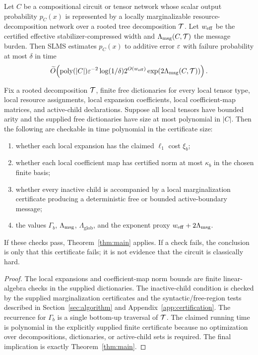 \begin{theorem}
\label{thm:main}
Let \(C\) be a compositional circuit or tensor network whose scalar output probability \(p_C(x)\) is represented by a locally marginalizable resource-decomposition network over a rooted tree decomposition \(\mathcal{T}\). Let \(w_{\mathrm{eff}}\) be the certified effective stabilizer-compressed width and \(\Lambda_{\mathrm{msg}}(C,\mathcal{T})\) the message burden. Then SLMS estimates \(p_C(x)\) to additive error \(\varepsilon\) with failure probability at most \(\delta\) in time
\[
\widetilde{O}\!\left(
\operatorname{poly}(|C|)
\varepsilon^{-2}\log(1/\delta)
2^{O(w_{\mathrm{eff}})}
\exp(2\Lambda_{\mathrm{msg}}(C,\mathcal{T}))
\right).
\]
\end{theorem}

\begin{proposition}
\label{prop:checkable-certificate}
Fix a rooted decomposition \(\mathcal{T}\), finite free dictionaries for every local tensor type, local resource assignments, local expansion coefficients, local coefficient-map matrices, and active-child declarations. Suppose all local tensors have bounded arity and the supplied free dictionaries have size at most polynomial in \(|C|\). Then the following are checkable in time polynomial in the certificate size:
\begin{enumerate}[leftmargin=1.2cm]
\item whether each local expansion has the claimed \(\ell_1\) cost \(\xi_b\);
\item whether each local coefficient map has certified norm at most \(\kappa_b\) in the chosen finite basis;
\item whether every inactive child is accompanied by a local marginalization certificate producing a deterministic free or bounded active-boundary message;
\item the values \(\Gamma_b\), \(\Lambda_{\mathrm{msg}}\), \(\Lambda_{\mathrm{glob}}\), and the exponent proxy \(w_{\mathrm{eff}}+2\Lambda_{\mathrm{msg}}\).
\end{enumerate}
If these checks pass, Theorem~\ref{thm:main} applies. If a check fails, the conclusion is only that this certificate fails; it is not evidence that the circuit is classically hard.
\end{proposition}

\begin{proof}
The local expansions and coefficient-map norm bounds are finite linear-algebra checks in the supplied dictionaries. The inactive-child condition is checked by the supplied marginalization certificates and the syntactic/free-region tests described in Section~\ref{sec:algorithm} and Appendix~\ref{app:certification}. The recurrence for \(\Gamma_b\) is a single bottom-up traversal of \(\mathcal{T}\). The claimed running time is polynomial in the explicitly supplied finite certificate because no optimization over decompositions, dictionaries, or active-child sets is required. The final implication is exactly Theorem~\ref{thm:main}.
\end{proof}

